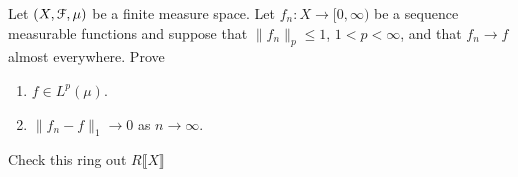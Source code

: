 \begin{problem}
  Let $(X,\mathcal{F},\mu)$ be a finite measure space. Let
  $f_n\colon X\to[0,\infty)$ be a sequence measurable functions and suppose
  that $\|f_n\|_p\leq 1$, $1<p<\infty$, and that $f_n\to f$ almost
  everywhere. Prove
  \begin{enumerate}[label=(\roman*),noitemsep]
  \item $f\in L^p(\mu)$.
  \item $\|f_n-f\|_1\to 0$ as $n\to\infty$.
  \end{enumerate}
\end{problem}
\begin{solution}
  Check this ring out $R\llbracket X\rrbracket$
\end{solution}

\begin{problem}
\end{problem}
\begin{solution}
\end{solution}

\begin{problem}
\end{problem}
\begin{solution}
\end{solution}

